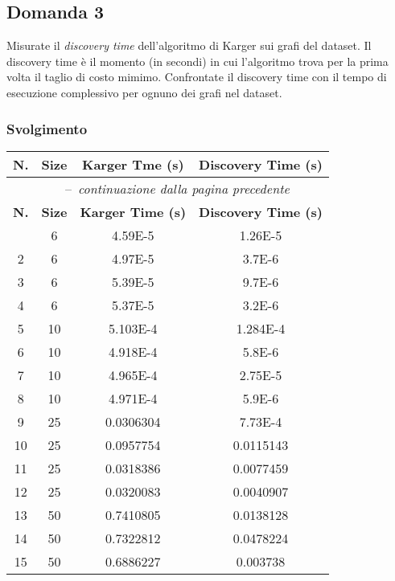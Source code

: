 \subsection{Domanda 3}
Misurate il \textit{discovery time} dell'algoritmo di Karger sui grafi del dataset. Il discovery time è il momento (in secondi) in cui l'algoritmo trova per la prima volta il taglio di costo mimimo.  Confrontate il discovery time con il tempo di esecuzione complessivo per ognuno dei grafi nel dataset.

\subsubsection{Svolgimento}

\begin{center}
	\begin{longtable}{|c|c|c|c|}	
		\hline
		\textbf{N.} & \textbf{Size} & \textbf{Karger Tme (s)} & \textbf{Discovery Time (s)} \\ \hline
		\endfirsthead
		\multicolumn{4}{|c|}{\tablename\ \thetable\ \ --\  \textit{continuazione dalla pagina precedente}} \\ \hline
		\textbf{N.} & \textbf{Size} & \textbf{Karger Time (s)} & \textbf{Discovery Time (s)}
		\endhead
		\hline \multicolumn{4}{|c|}{\textit{Continua nella pagina seguente}} \\ 
		\endfoot  
		\endlastfoot
		\hline
		1 & 6 & 4.59E-5	 & 1.26E-5 \\			    
		2 & 6 & 4.97E-5	 & 3.7E-6 \\			   	
		3 & 6 & 5.39E-5	 & 9.7E-6 \\		   		
		4 & 6 & 5.37E-5	 & 3.2E-6 \\			    
		5 & 10 & 5.103E-4 & 1.284E-4 \\	   		
		6 & 10 & 4.918E-4 & 5.8E-6 \\			  	
		7 & 10 & 4.965E-4 & 2.75E-5 \\			    
		8 & 10 & 4.971E-4 & 5.9E-6 \\			   	
		9 & 25 & 0.0306304 & 7.73E-4 \\
		10 & 25 & 0.0957754 & 0.0115143 \\		   	
		11 & 25 & 0.0318386 & 0.0077459 \\			
		12 & 25 & 0.0320083 & 0.0040907 \\	  		
		13 & 50 & 0.7410805 & 0.0138128 \\		    
		14 & 50 & 0.7322812 & 0.0478224 \\	    	
		15 & 50 & 0.6886227 & 0.003738 \\	  		

\end{longtable}
\end{center}

